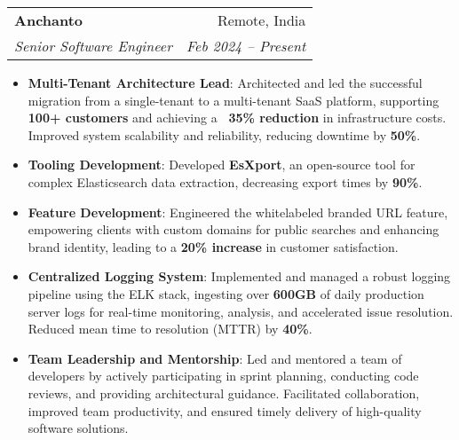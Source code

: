 \documentclass[letterpaper,11pt]{article}
\makeatletter
\newcommand{\resumeItem}[2]{
  \item\small{
    \textbf{#1}{: #2 \vspace{-2pt}}
  }
}
\newcommand{\resumeSubheading}[4]{
  \vspace{-1pt}\item
    \begin{tabular*}{0.97\textwidth}[t]{l@{\extracolsep{\fill}}r}
      \textbf{#1} & #2 \\
      \textit{\small#3} & \textit{\small #4} \\
    \end{tabular*}\vspace{-5pt}
}
\newcommand{\resumeItemListStart}{\begin{itemize}}
\newcommand{\resumeItemListEnd}{\end{itemize}\vspace{-5pt}}
\makeatother
\begin{document}
  \resumeSubheading
    {Anchanto}{Remote, India}
    {Senior Software Engineer}{Feb 2024 -- Present}
    \resumeItemListStart
      \resumeItem{Multi-Tenant Architecture Lead}
        {Architected and led the successful migration from a single-tenant to a multi-tenant SaaS platform, supporting \textbf{100+ customers} and achieving a \textbf{~35\% reduction} in infrastructure
        costs. Improved system scalability and reliability, reducing downtime by \textbf{50\%}.}
      \resumeItem{Tooling Development}
        {Developed \textbf{EsXport}, an open-source tool for complex Elasticsearch data extraction, decreasing export times by \textbf{90\%}.}
      \resumeItem{Feature Development}
        {Engineered the whitelabeled branded URL feature, empowering clients with custom domains for public searches and enhancing brand identity, leading to a \textbf{20\% increase} in customer
        satisfaction.}
      \resumeItem{Centralized Logging System}
        {Implemented and managed a robust logging pipeline using the ELK stack, ingesting over \textbf{600GB} of daily production server logs for real-time monitoring, analysis, and accelerated issue
        resolution. Reduced mean time to resolution (MTTR) by \textbf{40\%}.}
      \resumeItem{Team Leadership and Mentorship}
        {Led and mentored a team of developers by actively participating in sprint planning, conducting code reviews, and providing architectural guidance. Facilitated collaboration, improved team productivity, and ensured timely delivery of high-quality software solutions.}

    \resumeItemListEnd
\end{document}
